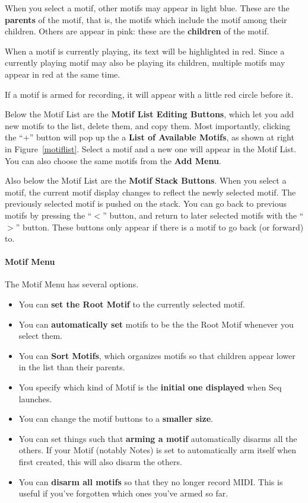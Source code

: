 \documentclass[twoside,10pt]{article}
\begin{document}
When you select a motif, other motifs may appear in light blue.  These are the {\bf parents} of the motif, that is, the motifs which include the motif among their children.  Others are appear in pink: these are the {\bf children} of the motif.

When a motif is currently playing, its text will be highlighted in red.  Since a currently playing motif may also be playing its children, multiple motifs may appear in red at the same time.  

If a motif is armed for recording, it will appear with a little red circle before it.

Below the Motif List are the {\bf Motif List Editing Buttons}, which let you add new motifs to the list, delete them, and copy them.   Most importantly, clicking the ``\(+\)'' button will pop up the a {\bf List of Available Motifs}, as shown at right in Figure~\ref{motiflist}.  Select a motif and a new one will appear in the Motif List.   You can also choose the same motifs from the {\bf Add Menu}.

Also below the Motif List are the {\bf Motif Stack Buttons}.  When you select a motif, the current motif display changes to reflect the newly selected motif.  The previously selected motif is pushed on the stack.  You can go back to previous motifs by pressing the ``\(<\)'' button, and return to later selected motifs with the ``\(>\)'' button.  These buttons only appear if there is a motif to go back (or forward) to.

\paragraph{Motif Menu}

The Motif Menu has several options.  

	\begin{itemize}
	\item You can {\bf set the Root Motif} to the currently selected motif.  
	\item You can {\bf automatically set} motifs to be the the Root Motif whenever you select them.  
	\item You can {\bf Sort Motifs}, which organizes motifs so that children appear lower in the list than their parents.  
	\item You specify which kind of Motif is the {\bf initial one displayed} when Seq launches.
	\item You can change the motif buttons to a {\bf smaller size}.
	\item You can set things such that {\bf arming a motif} automatically disarms all the others.  If your Motif (notably Notes) is set to automatically arm itself when first created, this will also disarm the others.
	\item You can {\bf disarm all motifs} so that they no longer record MIDI.  This is useful if you've forgotten which ones you've armed so far.
	\end{itemize}
\end{document}
